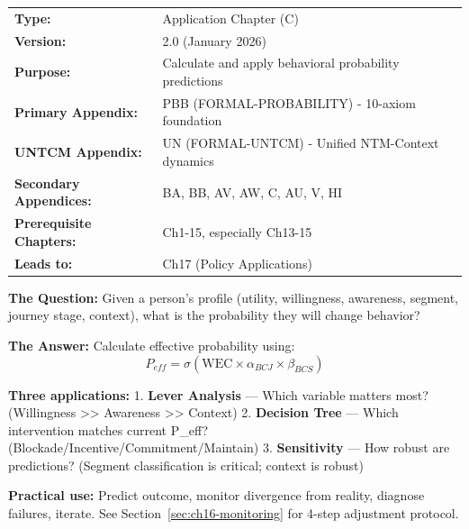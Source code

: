 
\begin{tcolorbox}[colback=gray!10!white, colframe=gray!75!black, title=Chapter Metadata]
\begin{tabular}{@{}ll@{}}
\textbf{Type:} & Application Chapter (C) \\
\textbf{Version:} & 2.0 (January 2026) \\
\textbf{Purpose:} & Calculate and apply behavioral probability predictions \\
\textbf{Primary Appendix:} & PBB (FORMAL-PROBABILITY) - 10-axiom foundation \\
\textbf{UNTCM Appendix:} & UN (FORMAL-UNTCM) - Unified NTM-Context dynamics \\
\textbf{Secondary Appendices:} & BA, BB, AV, AW, C, AU, V, HI \\
\textbf{Prerequisite Chapters:} & Ch1-15, especially Ch13-15 \\
\textbf{Leads to:} & Ch17 (Policy Applications) \\
\end{tabular}
\end{tcolorbox}

\begin{tcolorbox}[colback=yellow!5!white, colframe=yellow!75!black, title=Quick Reference: In 60 Seconds]
\textbf{The Question:} Given a person's profile (utility, willingness, awareness, segment, journey stage, context), what is the probability they will change behavior?

\textbf{The Answer:} Calculate effective probability using:
\[\boxed{P_{eff} = \sigma(\text{WEC} \times \alpha_{BCJ} \times \beta_{BCS})}\]

\textbf{Three applications:}
1. \textbf{Lever Analysis} — Which variable matters most? (Willingness >> Awareness >> Context)
2. \textbf{Decision Tree} — Which intervention matches current P_eff? (Blockade/Incentive/Commitment/Maintain)
3. \textbf{Sensitivity} — How robust are predictions? (Segment classification is critical; context is robust)

\textbf{Practical use:} Predict outcome, monitor divergence from reality, diagnose failures, iterate. See Section~\ref{sec:ch16-monitoring} for 4-step adjustment protocol.
\end{tcolorbox}


